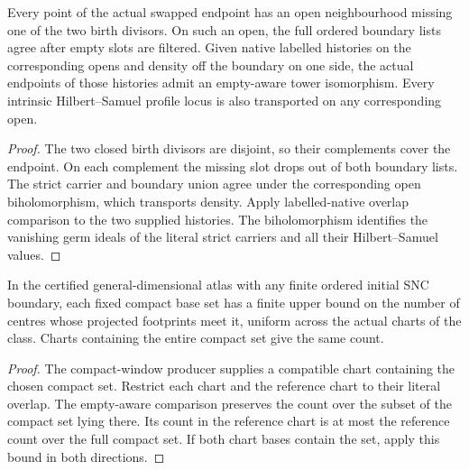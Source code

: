 \begin{theorem}
\label{hir:g8-disjoint-swap-native-overlap}
\leanok
Every point of the actual swapped endpoint has an open neighbourhood
missing one of the two birth divisors. On such an open, the full
ordered boundary lists agree after empty slots are filtered. Given
native labelled histories on the corresponding opens and density off
the boundary on one side, the actual endpoints of those histories
admit an empty-aware tower isomorphism. Every intrinsic Hilbert--Samuel
profile locus is also transported on any corresponding open.
\end{theorem}
\begin{proof}
The two closed birth divisors are disjoint, so their complements
cover the endpoint. On each complement the missing slot drops out
of both boundary lists. The strict carrier and boundary union agree
under the corresponding open biholomorphism, which transports
density. Apply labelled-native overlap comparison to the two
supplied histories. The biholomorphism identifies the vanishing
germ ideals of the literal strict carriers and all their
Hilbert--Samuel values.
\end{proof}

\begin{theorem}
\label{hir:g8-atlas-compact-probe-bound}
\leanok
In the certified general-dimensional atlas with any finite ordered
initial SNC boundary, each fixed compact base set has a finite upper
bound on the number of centres whose projected footprints meet it,
uniform across the actual charts of the class. Charts containing the
entire compact set give the same count.
\end{theorem}
\begin{proof}
The compact-window producer supplies a compatible chart containing
the chosen compact set. Restrict each chart and the reference chart
to their literal overlap. The empty-aware comparison preserves the
count over the subset of the compact set lying there. Its count in
the reference chart is at most the reference count over the full
compact set. If both chart bases contain the set, apply this bound
in both directions.
\end{proof}

